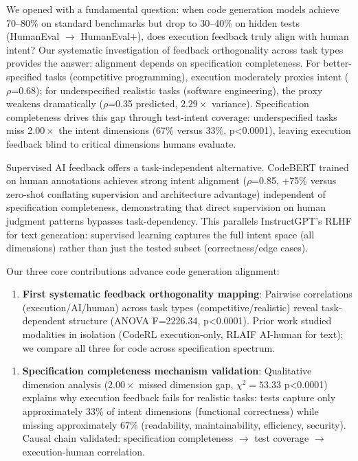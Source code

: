 
We opened with a fundamental question: when code generation models achieve 70--80\% on standard benchmarks but drop to 30--40\% on hidden tests (HumanEval $\rightarrow$ HumanEval+), does execution feedback truly align with human intent? Our systematic investigation of feedback orthogonality across task types provides the answer: alignment depends on specification completeness. For better-specified tasks (competitive programming), execution moderately proxies intent ($\rho$=0.68); for underspecified realistic tasks (software engineering), the proxy weakens dramatically ($\rho$=0.35 predicted, 2.$29\times$ variance). Specification completeness drives this gap through test-intent coverage: underspecified tasks miss 2.$00\times$ the intent dimensions (67\% versus 33\%, p<0.0001), leaving execution feedback blind to critical dimensions humans evaluate.

Supervised AI feedback offers a task-independent alternative. CodeBERT trained on human annotations achieves strong intent alignment ($\rho$=0.85, +75\% versus zero-shot conflating supervision and architecture advantage) independent of specification completeness, demonstrating that direct supervision on human judgment patterns bypasses task-dependency. This parallels InstructGPT's RLHF for text generation: supervised learning captures the full intent space (all dimensions) rather than just the tested subset (correctness/edge cases).

Our three core contributions advance code generation alignment:

\begin{enumerate}
\item \textbf{First systematic feedback orthogonality mapping}: Pairwise correlations (execution/AI/human) across task types (competitive/realistic) reveal task-dependent structure (ANOVA F=2226.34, p<0.0001). Prior work studied modalities in isolation (CodeRL execution-only, RLAIF AI-human for text); we compare all three for code across specification spectrum.
\end{enumerate}

\begin{enumerate}
\item \textbf{Specification completeness mechanism validation}: Qualitative dimension analysis (2.$00\times$ missed dimension gap, $\chi^{2}=53.33$ p<0.0001) explains why execution feedback fails for realistic tasks: tests capture only approximately 33\% of intent dimensions (functional correctness) while missing approximately 67\% (readability, maintainability, efficiency, security). Causal chain validated: specification completeness $\rightarrow$ test coverage $\rightarrow$ execution-human correlation.
\end{enumerate}

